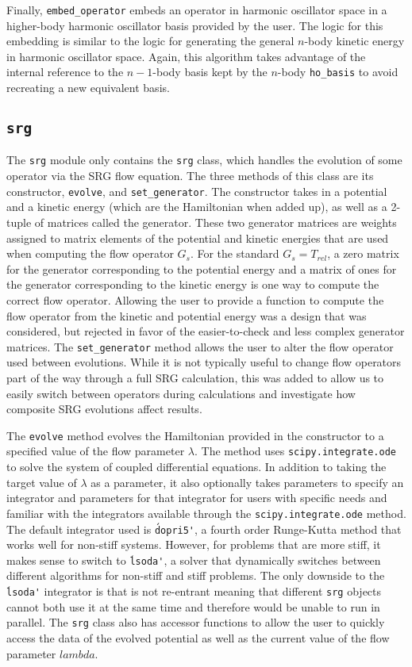 Finally, \texttt{embed\_operator} embeds an operator in harmonic oscillator space in a higher-body harmonic oscillator basis provided by the user. The logic for this embedding is similar to the logic for generating the general $n$-body kinetic energy in harmonic oscillator space. Again, this algorithm takes advantage of the internal reference to the $n-1$-body basis kept by the $n$-body \texttt{ho\_basis} to avoid recreating a new equivalent basis.

\subsection{\texttt{srg}}

The \texttt{srg} module only contains the \texttt{srg} class, which handles the evolution of some operator via the SRG flow equation. The three methods of this class are its constructor, \texttt{evolve}, and \texttt{set\_generator}. The constructor takes in a potential and a kinetic energy (which are the Hamiltonian when added up), as well as a 2-tuple of matrices called the generator. These two generator matrices are weights assigned to matrix elements of the potential and kinetic energies that are used when computing the flow operator $G_s$. For the standard $G_s = T_{rel}$, a zero matrix for the generator corresponding to the potential energy and a matrix of ones for the generator corresponding to the kinetic energy is one way to compute the correct flow operator. Allowing the user to provide a function to compute the flow operator from the kinetic and potential energy was a design that was considered, but rejected in favor of the easier-to-check and less complex generator matrices. The \texttt{set\_generator} method allows the user to alter the flow operator used between evolutions. While it is not typically useful to change flow operators part of the way through a full SRG calculation, this was added to allow us to easily switch between operators during calculations and investigate how composite SRG evolutions affect results.

The \texttt{evolve} method evolves the Hamiltonian provided in the constructor to a specified value of the flow parameter $\lambda$. The method uses \texttt{scipy.integrate.ode} to solve the system of coupled differential equations. In addition to taking the target value of $\lambda$ as a parameter, it also optionally takes parameters to specify an integrator and parameters for that integrator for users with specific needs and familiar with the integrators available through the \texttt{scipy.integrate.ode} method. The default integrator used is \texttt{\'dopri5\'}, a fourth order Runge-Kutta method that works well for non-stiff systems. However, for problems that are more stiff, it makes sense to switch to \texttt{\'lsoda\'}, a solver that dynamically switches between different algorithms for non-stiff and stiff problems. The only downside to the \texttt{\'lsoda\'} integrator is that is not re-entrant meaning that different \texttt{srg} objects cannot both use it at the same time and therefore would be unable to run in parallel. The \texttt{srg} class also has accessor functions to allow the user to quickly access the data of the evolved potential as well as the current value of the flow parameter $lambda$.

